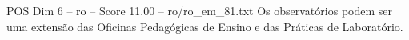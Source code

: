\begin{textsample}{POS Dim 6 – ro – Score 11.00 – ro/ro\_em\_81.txt}
Os observatórios podem ser uma extensão das Oficinas Pedagógicas de Ensino e das Práticas de Laboratório.

\end{textsample}
